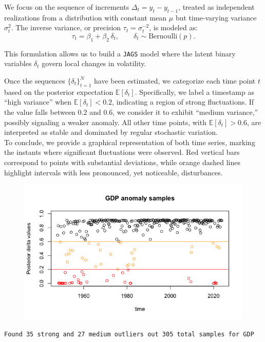\documentclass{Configuration_Files/PoliMi3i_thesis}
\begin{document}
We focus on the sequence of increments \(\Delta_t = y_t - y_{t-1}\), treated as independent realizations from a distribution with constant mean \(\mu\) but time-varying variance \(\sigma_t^2\). The inverse variance, or precision \(\tau_t = \sigma_t^{-2}\), is modeled as:
\[
\tau_t = \beta_1 + \beta_2\, \delta_t, \qquad \delta_t \sim \text{Bernoulli}(p).
\]

This formulation allows us to build a \texttt{JAGS} model where the latent binary variables \(\delta_t\) govern local changes in volatility.

Once the sequences \(\{\delta_t\}_{t=1}^N\) have been estimated, we categorize each time point \(t\) based on the posterior expectation \(\mathbb{E}[\delta_t]\). Specifically, we label a timestamp as ``high variance'' when \(\mathbb{E}[\delta_t] < 0.2\), indicating a region of strong fluctuations. If the value falls between \(0.2\) and \(0.6\), we consider it to exhibit ``medium variance,'' possibly signaling a weaker anomaly. All other time points, with \(\mathbb{E}[\delta_t] > 0.6\), are interpreted as stable and dominated by regular stochastic variation.\\

To conclude, we provide a graphical representation of both time series, marking the instants where significant fluctuations were observed. Red vertical bars correspond to points with substantial deviations, while orange dashed lines highlight intervals with less pronounced, yet noticeable, disturbances.\\
\begin{figure}[H]
    \centering
    \includegraphics[width=0.75\linewidth]{GDP_anomaly.png}
\end{figure}
\begin{center}
    \texttt{Found 35 strong and 27 medium outliers out 305 total samples for GDP}
\end{center}
\end{document}
